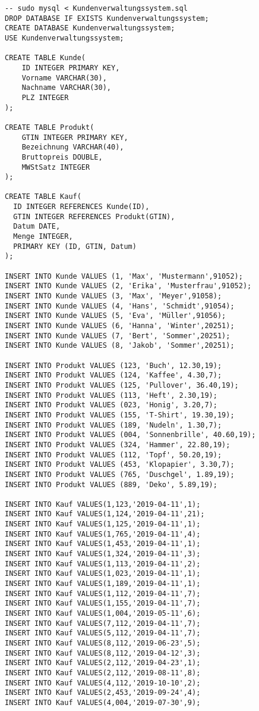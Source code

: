 \documentclass{lehramt-informatik-aufgabe}
\begin{document}
\begin{verbatim}
-- sudo mysql < Kundenverwaltungssystem.sql
DROP DATABASE IF EXISTS Kundenverwaltungssystem;
CREATE DATABASE Kundenverwaltungssystem;
USE Kundenverwaltungssystem;

CREATE TABLE Kunde(
	ID INTEGER PRIMARY KEY,
	Vorname VARCHAR(30),
	Nachname VARCHAR(30),
	PLZ INTEGER
);

CREATE TABLE Produkt(
	GTIN INTEGER PRIMARY KEY,
	Bezeichnung VARCHAR(40),
	Bruttopreis DOUBLE,
	MWStSatz INTEGER
);

CREATE TABLE Kauf(
  ID INTEGER REFERENCES Kunde(ID),
  GTIN INTEGER REFERENCES Produkt(GTIN),
  Datum DATE,
  Menge INTEGER,
  PRIMARY KEY (ID, GTIN, Datum)
);

INSERT INTO Kunde VALUES (1, 'Max', 'Mustermann',91052);
INSERT INTO Kunde VALUES (2, 'Erika', 'Musterfrau',91052);
INSERT INTO Kunde VALUES (3, 'Max', 'Meyer',91058);
INSERT INTO Kunde VALUES (4, 'Hans', 'Schmidt',91054);
INSERT INTO Kunde VALUES (5, 'Eva', 'Müller',91056);
INSERT INTO Kunde VALUES (6, 'Hanna', 'Winter',20251);
INSERT INTO Kunde VALUES (7, 'Bert', 'Sommer',20251);
INSERT INTO Kunde VALUES (8, 'Jakob', 'Sommer',20251);

INSERT INTO Produkt VALUES (123, 'Buch', 12.30,19);
INSERT INTO Produkt VALUES (124, 'Kaffee', 4.30,7);
INSERT INTO Produkt VALUES (125, 'Pullover', 36.40,19);
INSERT INTO Produkt VALUES (113, 'Heft', 2.30,19);
INSERT INTO Produkt VALUES (023, 'Honig', 3.20,7);
INSERT INTO Produkt VALUES (155, 'T-Shirt', 19.30,19);
INSERT INTO Produkt VALUES (189, 'Nudeln', 1.30,7);
INSERT INTO Produkt VALUES (004, 'Sonnenbrille', 40.60,19);
INSERT INTO Produkt VALUES (324, 'Hammer', 22.80,19);
INSERT INTO Produkt VALUES (112, 'Topf', 50.20,19);
INSERT INTO Produkt VALUES (453, 'Klopapier', 3.30,7);
INSERT INTO Produkt VALUES (765, 'Duschgel', 1.89,19);
INSERT INTO Produkt VALUES (889, 'Deko', 5.89,19);

INSERT INTO Kauf VALUES(1,123,'2019-04-11',1);
INSERT INTO Kauf VALUES(1,124,'2019-04-11',21);
INSERT INTO Kauf VALUES(1,125,'2019-04-11',1);
INSERT INTO Kauf VALUES(1,765,'2019-04-11',4);
INSERT INTO Kauf VALUES(1,453,'2019-04-11',1);
INSERT INTO Kauf VALUES(1,324,'2019-04-11',3);
INSERT INTO Kauf VALUES(1,113,'2019-04-11',2);
INSERT INTO Kauf VALUES(1,023,'2019-04-11',1);
INSERT INTO Kauf VALUES(1,189,'2019-04-11',1);
INSERT INTO Kauf VALUES(1,112,'2019-04-11',7);
INSERT INTO Kauf VALUES(1,155,'2019-04-11',7);
INSERT INTO Kauf VALUES(1,004,'2019-05-11',6);
INSERT INTO Kauf VALUES(7,112,'2019-04-11',7);
INSERT INTO Kauf VALUES(5,112,'2019-04-11',7);
INSERT INTO Kauf VALUES(8,112,'2019-06-23',5);
INSERT INTO Kauf VALUES(8,112,'2019-04-12',3);
INSERT INTO Kauf VALUES(2,112,'2019-04-23',1);
INSERT INTO Kauf VALUES(2,112,'2019-08-11',8);
INSERT INTO Kauf VALUES(4,112,'2019-10-10',2);
INSERT INTO Kauf VALUES(2,453,'2019-09-24',4);
INSERT INTO Kauf VALUES(4,004,'2019-07-30',9);
\end{verbatim}
\end{document}
